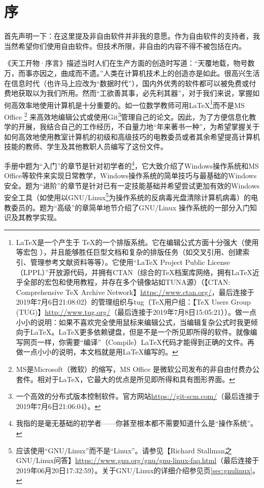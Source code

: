\section{序}
首先声明一下：在这里提及非自由软件并非我的意愿。作为自由软件的支持者，我当然希望你们使用自由软件。但技术所限，非自由的内容不得不被包括在内。\par
《天工开物·序言》描述当时人们在生产方面的创造时写道：“天覆地载，物号数万，而事亦因之，曲成而不遗。”人类在计算机技术上的创造亦是如此。很高兴生活在信息时代（也许马上应改为“数据时代”），国内外优秀的软件都可以被免费或付费地获取以为我们所用。然而“工欲善其事，必先利其器”，对于我们来说，掌握如何高效率地使用计算机是十分重要的。如一位数学教师可用\LaTeX\footnote{\LaTeX 是一个产生于 \TeX 的一个排版系统。它在编辑公式方面十分强大（使用 \AmSTeX 等宏包 ），并且能够胜任巨型文档和复杂的排版任务（如交叉引用、创建索引、管理参考文献资料等等）。它使用“LaTeX Project Public Li­cense （LPPL）”开放源代码，并拥有CTAN（综合的TeX档案库网络，拥有\LaTeX 近乎全部的宏包和使用教程，并存在多个镜像站如TUNA源）（【CTAN: Comprehensive TeX Archive Network】\url{https://www.ctan.org/}，最后连接于2019年7月6日21:08:02）的管理组织与tug（\TeX 用户组：【TeX Users Group (TUG)】\url{http://www.tug.org/}（最后连接于2019年7月8日15:05:21））。做一点小小的说明：如果不喜欢完全使用鼠标来编辑公式，当编辑复杂公式时我更倾向于\LaTeX。\LaTeX 更多依赖键盘，但是不是一个所见即所得的软件。就像编写网页一样，你需要“编译”（Compile）\LaTeX 代码才能得到正确的文件。再做一点小小的说明，本文档就是用\LaTeX 编写的。}而不是MS Office \footnote{MS是Microsoft（微软）的缩写，MS Office 是微软公司发布的非自由付费办公套件。相对于\LaTeX ，它最大的优点是所见即所得和具有图形界面。} 来高效地编辑公式或使用Git\footnote{一个高效的分布式版本控制软件。官方网站\url{https://git-scm.com/}（最后连接于2019年7月6日21:06:04）。}管理自己的论文。因此，为了方便信息化教学的开展，我结合自己的工作经历，不自量力地“年来著书一种”，为希望掌握关于如何高效地使用教室计算机的初级和高级技巧的电教委员或者其余希望提高计算机技能的教师、学生及其他教职人员编写了这份文件。\par
手册中题为“入门”的章节是针对初学者的\footnote{我指的是毫无基础的初学者——你甚至根本都不需要知道什么是“操作系统”。}，它大致介绍了Windows操作系统和MS Office等软件来实现日常教学，Windows操作系统的简单技巧与最基础的Windows安全。题为“进阶”的章节是针对已有一定技能基础并希望尝试更加有效的Windows安全工具（如使用以GNU/Linux\footnote{应该使用“GNU/Linux”而不是“Linux”。请参见【Richard Stallman之GNU/Linux问答】\url{https://www.gnu.org/gnu/gnu-linux-faq.html}（最后连接于2019年06月20日17:32:59）。关于GNU/Linux的详细介绍参见\pageref{sec:gnulinux}页\ref{sec:gnulinux}。}为操作系统的反病毒光盘清除计算机病毒）的电教委员的。题为“高级”的章简单地节介绍了GNU/Linux 操作系统的一部分入门知识及其教学实现。\par
